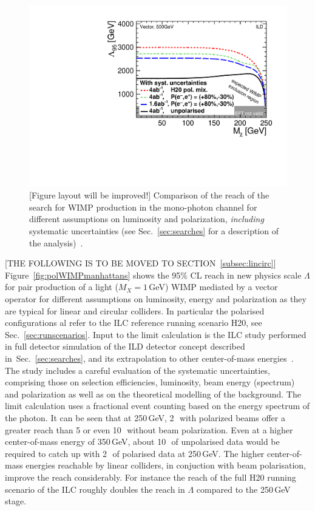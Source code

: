 \begin{figure}
\centering
\includegraphics[width=0.95\linewidth]{./chapters/figures/vector_withSystematics.pdf}
		
\caption{{\color{red}[Figure layout will be improved!]} Comparison of the reach of the search for WIMP production in the mono-photon channel for different assumptions on luminosity and polarization, {\em including} systematic uncertainties (see Sec.~\ref{sec:searches} for a description of the analysis)~\cite{Habermehl:417605}. }
\label{fig:polWIMPsys}
\end{figure}



{\color{red}[THE FOLLOWING IS TO BE MOVED TO SECTION~\ref{subsec:lincirc}]}\\
Figure~\ref{fig:polWIMPmanhattans} shows the 95\% CL reach in new physics scale $\Lambda$ for pair production of a light ($M_{X} = 1$\,GeV) WIMP mediated by a vector operator for different assumptions on luminosity, energy and polarization 
as they are typical for linear and circular colliders. In particular the polarised
configurations al refer to the ILC reference running scenario H20, see Sec.~\ref{sec:runscenarios}. Input to the limit calculation is the ILC study performed in full detector simulation of the ILD detector concept described in~Sec.~\ref{sec:searches}, and its extrapolation to other center-of-mass energies~\cite{Habermehl:417605}. The study includes a careful evaluation of the systematic uncertainties, comprising those on selection efficiencies, luminosity, beam energy (spectrum) and polarization as well as on the theoretical modelling of the background. The limit calculation uses a fractional event counting based on the 
energy spectrum of the photon. It can be seen that at 250\,GeV, 2\,\iab\ with polarized beams offer a greater reach than 5 or even 10\,\iab\ without beam polarization. Even at a higher center-of-mass energy of 350\,GeV, about 10\,\iab\ of unpolarised data  would be required to catch up with 2\,\iab\ of polarised data at 250\,GeV. The higher center-of-mass energies reachable by linear colliders, in conjuction with beam polarisation, improve the reach considerably. For instance the reach of the full H20 running scenario of the ILC roughly doubles the reach in $\Lambda$ compared to the 250\,GeV stage.

